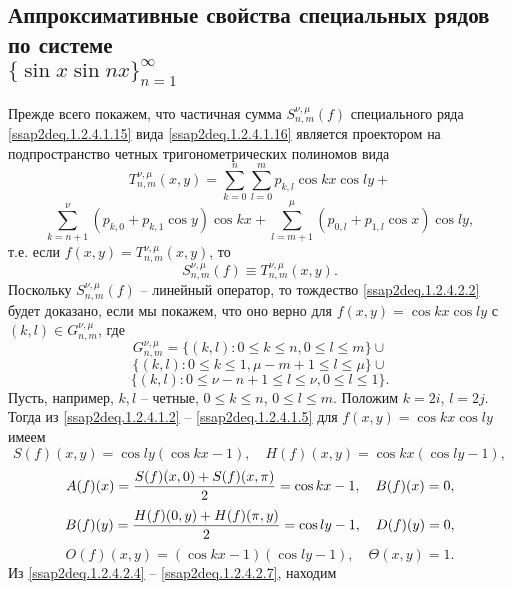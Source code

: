 \subsection{Аппроксимативные свойства специальных рядов по системе \\ $\{\sin x\sin nx\}_{n=1}^\infty$}
Прежде всего покажем, что частичная сумма  $S_{n,m}^{\nu,\mu}(f)$ специального ряда \eqref{ssap2deq.1.2.4.1.15} вида \eqref{ssap2deq.1.2.4.1.16}  является проектором на подпространство четных  тригонометрических полиномов вида
$$
T_{n,m}^{\nu,\mu}(x,y)=
 \sum_{k=0}^{n}\sum_{l=0}^{m} p_{k,l}\cos kx\cos ly+
$$
\begin{equation}\label{ssap2deq.1.2.4.2.1}
\sum_{k=n+1}^{\nu} (p_{k,0}+p_{k,1}\cos y)\cos kx
 +\sum_{l=m+1}^{\mu} (p_{0,l}+ p_{1,l}\cos x)\cos ly,
\end{equation}
  т.е. если $f(x,y)=T_{n,m}^{\nu,\mu}(x,y)$, то
  \begin{equation}\label{ssap2deq.1.2.4.2.2}
  S_{n,m}^{\nu,\mu}(f)\equiv T_{n,m}^{\nu,\mu}(x,y).
  \end{equation}
Поскольку  $S_{n,m}^{\nu,\mu}(f)$ -- линейный оператор, то тождество \eqref{ssap2deq.1.2.4.2.2} будет доказано, если мы покажем, что оно верно для $f(x,y)=\cos kx\cos ly$ с $(k,l)\in G_{n,m}^{\nu,\mu}$, где
$$
G_{n,m}^{\nu,\mu}=\{(k,l):0\le k\le n,0\le l\le m\}\cup
$$
$$
\{(k,l):0\le k\le 1,\mu-m+1\le l\le \mu\}\cup
$$
\begin{equation}\label{ssap2deq.1.2.4.2.3}
\{(k,l):0\le \nu-n+1\le l\le \nu,0\le l\le 1\}.
\end{equation}
Пусть, например, $k,l$ -- четные, $0\le k\le n$, $0\le l\le m$. Положим $k=2i$, $l=2j$. Тогда из \eqref{ssap2deq.1.2.4.1.2}  -- \eqref{ssap2deq.1.2.4.1.5} для  $f(x,y)=\cos kx\cos ly$ имеем
\begin{equation}\label{ssap2deq.1.2.4.2.4}
S(f)(x,y)=\cos ly(\cos kx-1),\quad H(f)(x,y)=\cos kx(\cos ly-1),
\end{equation}
\begin{equation}\label{ssap2deq.1.2.4.2.5}
A(f)(x)={S(f)(x,0)+S(f)(x,\pi)\over2}=\cos kx-1,\quad B(f)(x)=0,
\end{equation}
\begin{equation}\label{ssap2deq.1.2.4.2.6}
B(f)(y)={H(f)(0,y)+H(f)(\pi,y)\over2}=\cos ly-1,\quad D(f)(y)=0,
\end{equation}
\begin{equation}\label{ssap2deq.1.2.4.2.7}
O(f)(x,y)=(\cos kx-1)(\cos ly-1), \quad \Theta(x,y)=1.
\end{equation}
Из  \eqref{ssap2deq.1.2.4.2.4} -- \eqref{ssap2deq.1.2.4.2.7}, находим
